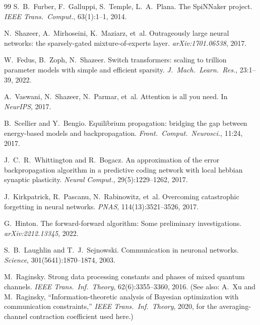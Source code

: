 \documentclass[11pt]{article}
\theoremstyle{definition}
\theoremstyle{remark}
\begin{document}
\begin{thebibliography}{99}
S.~B.~Furber, F.~Galluppi, S.~Temple, L.~A.~Plana.
\newblock The SpiNNaker project.
\newblock \emph{IEEE Trans.~Comput.}, 63(1):1--1, 2014.

N.~Shazeer, A.~Mirhoseini, K.~Maziarz, et~al.
\newblock Outrageously large neural networks: the sparsely-gated
  mixture-of-experts layer.
\newblock \emph{arXiv:1701.06538}, 2017.

W.~Fedus, B.~Zoph, N.~Shazeer.
\newblock Switch transformers: scaling to trillion parameter models with
  simple and efficient sparsity.
\newblock \emph{J.~Mach.~Learn.~Res.}, 23:1--39, 2022.

A.~Vaswani, N.~Shazeer, N.~Parmar, et~al.
\newblock Attention is all you need.
\newblock In \emph{NeurIPS}, 2017.

B.~Scellier and Y.~Bengio.
\newblock Equilibrium propagation: bridging the gap between energy-based
  models and backpropagation.
\newblock \emph{Front.~Comput.~Neurosci.}, 11:24, 2017.

J.~C.~R.~Whittington and R.~Bogacz.
\newblock An approximation of the error backpropagation algorithm in a
  predictive coding network with local hebbian synaptic plasticity.
\newblock \emph{Neural Comput.}, 29(5):1229--1262, 2017.

J.~Kirkpatrick, R.~Pascanu, N.~Rabinowitz, et~al.
\newblock Overcoming catastrophic forgetting in neural networks.
\newblock \emph{PNAS}, 114(13):3521--3526, 2017.

G.~Hinton.
\newblock The forward-forward algorithm: Some preliminary
  investigations.
\newblock \emph{arXiv:2212.13345}, 2022.

S.~B.~Laughlin and T.~J.~Sejnowski.
\newblock Communication in neuronal networks.
\newblock \emph{Science}, 301(5641):1870--1874, 2003.

M.~Raginsky.
\newblock Strong data processing constants and phases of mixed quantum
  channels.
\newblock \emph{IEEE Trans.~Inf.~Theory}, 62(6):3355--3360, 2016.
\newblock (See also: A.~Xu and M.~Raginsky, ``Information-theoretic
  analysis of Bayesian optimization with communication
  constraints,''\emph{ IEEE Trans.~Inf.~Theory}, 2020, for the
  averaging-channel contraction coefficient used here.)
\end{thebibliography}
\end{document}
